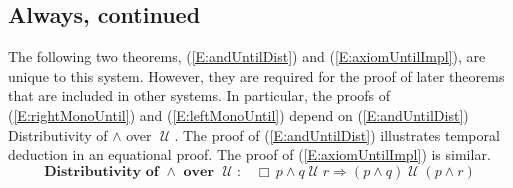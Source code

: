 \documentclass[12pt, fleqn, leqno]{article}
\newcommand{\impl}{\ensuremath{\Rightarrow}}        %
\newcommand{\Until}{\;\mathcal{U}\;}
\newcommand{\Always}{\Box\,}
\begin{document}
\subsection{Always, continued}\label{section-always-continued-1}

The following two theorems, (\ref{E:andUntilDist}) and (\ref{E:axiomUntilImpl}), are unique to this system.
However, they are required for the proof of later theorems that are included in other systems.
In particular, the proofs of (\ref{E:rightMonoUntil}) and (\ref{E:leftMonoUntil}) depend on (\ref{E:andUntilDist}) Distributivity of $\land$ over $\Until$.
The proof of (\ref{E:andUntilDist}) illustrates temporal deduction in an equational proof.
The proof of (\ref{E:axiomUntilImpl}) is similar.
\begin{equation}\label{E:andUntilDist}
\textbf{Distributivity of $\land$ over $\Until$:}\quad \Always p \land q \Until r \impl (p \land q) \Until (p \land r)
\end{equation}
\end{document}
